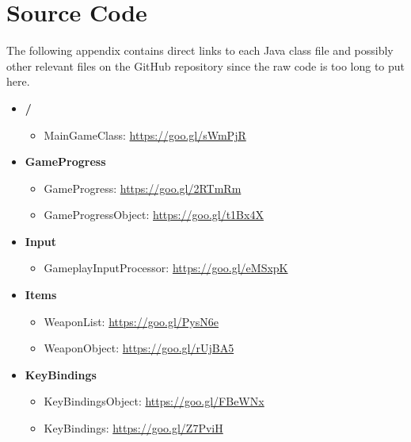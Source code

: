 \documentclass[12p]{article}
\begin{document}

\section{Source Code} \label{SourceCode}

The following appendix contains direct links to each Java class file and possibly other relevant files on the GitHub repository since the raw code is too long to put here.

\newpage

\renewcommand{\labelitemi}{\faFolderOpen}
\renewcommand{\labelitemii}{\faFile}
\renewcommand{\labelitemiii}{\faFile}
\begin{itemize}
    \item \textbf{/}
    \begin{itemize}
        \item MainGameClass: \url{https://goo.gl/sWmPjR}
    \end{itemize}
    
    \item \textbf{GameProgress}
    \begin{itemize}
        \item GameProgress: \url{https://goo.gl/2RTmRm} 
        \item GameProgressObject: \url{https://goo.gl/t1Bx4X}
    \end{itemize}
    
    \item \textbf{Input}
    \begin{itemize}
        \item GameplayInputProcessor: \url{https://goo.gl/eMSxpK}
    \end{itemize}
    
    \item \textbf{Items}
    \begin{itemize}
        \item WeaponList: \url{https://goo.gl/PysN6e}
        \item WeaponObject: \url{https://goo.gl/rUjBA5}
    \end{itemize}
    
    \item \textbf{KeyBindings}
    \begin{itemize}
        \item KeyBindingsObject: \url{https://goo.gl/FBeWNx}
        \item KeyBindings: \url{https://goo.gl/Z7PviH}
    \end{itemize}
    

\end{itemize}
\end{document}
